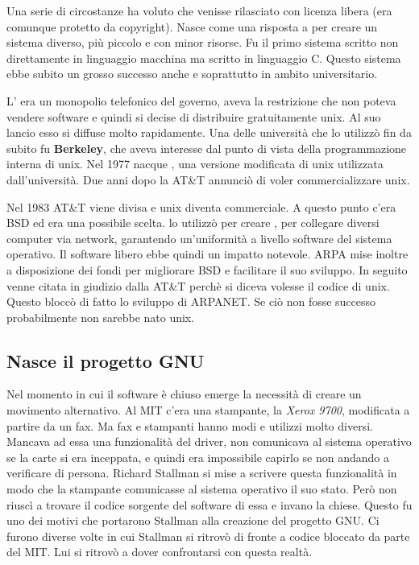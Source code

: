 Una serie di circostanze ha voluto che  venisse rilasciato con licenza libera (era comunque protetto da copyright). Nasce come una risposta a  per creare un sistema diverso, più piccolo e con minor risorse. Fu il primo sistema scritto non direttamente in linguaggio macchina ma scritto in linguaggio C. Questo sistema ebbe subito un grosso successo anche e soprattutto in ambito universitario. 

L' era un monopolio telefonico del governo, aveva la restrizione che non poteva vendere software e quindi si decise di distribuire gratuitamente unix. Al suo lancio esso si diffuse molto rapidamente. Una delle università che lo utilizzò fin da subito fu \textbf{Berkeley}, che aveva interesse dal punto di vista della programmazione interna di unix. Nel 1977 nacque , una versione modificata di unix utilizzata dall'università. Due anni dopo la AT\&T annunciò di voler commercializzare unix. 

Nel 1983 AT\&T viene divisa e unix diventa commerciale. A questo punto c'era BSD ed era una possibile scelta.  lo utilizzò per creare , per collegare diversi computer via network, garantendo un'uniformità a livello software del sistema operativo. Il software libero ebbe quindi un impatto notevole. ARPA mise inoltre a disposizione dei fondi per migliorare BSD e facilitare il suo sviluppo. In seguito venne citata in giudizio dalla AT\&T perchè si diceva volesse il codice di unix. Questo bloccò di fatto lo sviluppo di ARPANET. Se ciò non fosse successo probabilmente non sarebbe nato unix.

\subsection{Nasce il progetto GNU}

Nel momento in cui il software è chiuso emerge la necessità di creare un movimento alternativo. Al MIT c'era una stampante, la \textit{Xerox 9700}, modificata a partire da un fax. Ma fax e stampanti hanno modi e utilizzi molto diversi. Mancava ad essa una funzionalità del driver, non comunicava al sistema operativo se la carte si era inceppata, e quindi era impossibile capirlo se non andando a verificare di persona. Richard Stallman si mise a scrivere questa funzionalità in modo che la stampante comunicasse al sistema operativo il suo stato. Però non riuscì a trovare il codice sorgente del software di essa e invano la chiese. Questo fu uno dei motivi che portarono Stallman alla creazione del progetto GNU. Ci furono diverse volte in cui Stallman si ritrovò di fronte a codice bloccato da parte del MIT. Lui si ritrovò a dover confrontarsi con questa realtà.

